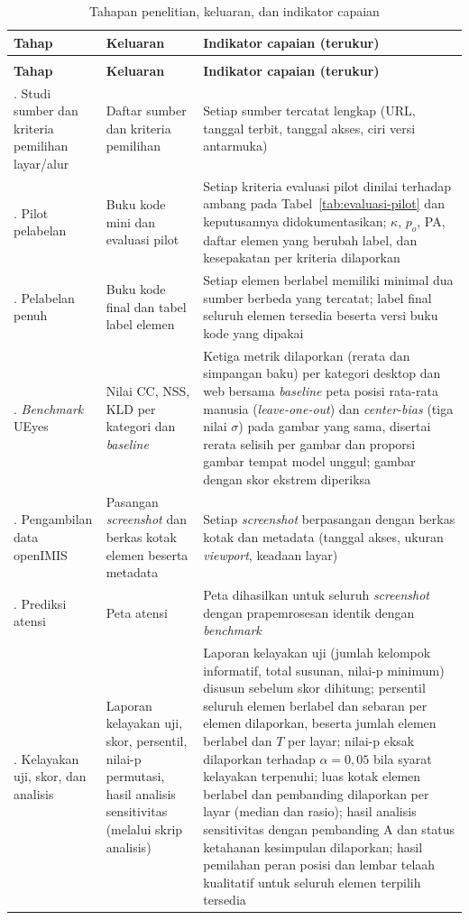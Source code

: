 \begin{longtable}{>{\raggedright\arraybackslash}p{}>{\raggedright\arraybackslash}p{}>{\raggedright\arraybackslash}p{}}
\caption{Tahapan penelitian, keluaran, dan indikator capaian}
\label{tab:tahapan}\\
\hline
\textbf{Tahap} & \textbf{Keluaran} & \textbf{Indikator capaian (terukur)} \\
\hline
\endfirsthead
\multicolumn{3}{l}{\emph{Tabel~\ref{tab:tahapan} (lanjutan)}}\\
\hline
\textbf{Tahap} & \textbf{Keluaran} & \textbf{Indikator capaian (terukur)} \\
\hline
\endhead
\hline
\endfoot
1. Studi sumber dan kriteria pemilihan layar/alur & Daftar sumber dan kriteria pemilihan & Setiap sumber tercatat lengkap (URL, tanggal terbit, tanggal akses, ciri versi antarmuka) \\
\hline
2. Pilot pelabelan & Buku kode mini dan evaluasi pilot & Setiap kriteria evaluasi pilot dinilai terhadap ambang pada Tabel~\ref{tab:evaluasi-pilot} dan keputusannya didokumentasikan; $\kappa$, $p_o$, PA, daftar elemen yang berubah label, dan kesepakatan per kriteria dilaporkan \\
\hline
3. Pelabelan penuh & Buku kode final dan tabel label elemen & Setiap elemen berlabel memiliki minimal dua sumber berbeda yang tercatat; label final seluruh elemen tersedia beserta versi buku kode yang dipakai \\
\hline
4. \emph{Benchmark} UEyes & Nilai CC, NSS, KLD per kategori dan \emph{baseline} & Ketiga metrik dilaporkan (rerata dan simpangan baku) per kategori desktop dan web bersama \emph{baseline} peta posisi rata-rata manusia (\emph{leave-one-out}) dan \emph{center-bias} (tiga nilai $\sigma$) pada gambar yang sama, disertai rerata selisih per gambar dan proporsi gambar tempat model unggul; gambar dengan skor ekstrem diperiksa \\
\hline
5. Pengambilan data openIMIS & Pasangan \emph{screenshot} dan berkas kotak elemen beserta metadata & Setiap \emph{screenshot} berpasangan dengan berkas kotak dan metadata (tanggal akses, ukuran \emph{viewport}, keadaan layar) \\
\hline
6. Prediksi atensi & Peta atensi & Peta dihasilkan untuk seluruh \emph{screenshot} dengan prapemrosesan identik dengan \emph{benchmark} \\
\hline
7. Kelayakan uji, skor, dan analisis & Laporan kelayakan uji, skor, persentil, nilai-p permutasi, hasil analisis sensitivitas (melalui skrip analisis) & Laporan kelayakan uji (jumlah kelompok informatif, total susunan, nilai-p minimum) disusun sebelum skor dihitung; persentil seluruh elemen berlabel dan sebaran per elemen dilaporkan, beserta jumlah elemen berlabel dan $T$ per layar; nilai-p eksak dilaporkan terhadap $\alpha = 0{,}05$ bila syarat kelayakan terpenuhi; luas kotak elemen berlabel dan pembanding dilaporkan per layar (median dan rasio); hasil analisis sensitivitas dengan pembanding A dan status ketahanan kesimpulan dilaporkan; hasil pemilahan peran posisi dan lembar telaah kualitatif untuk seluruh elemen terpilih tersedia \\

\end{longtable}
